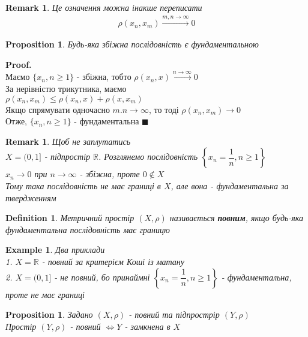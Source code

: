 \documentclass[a4paper, 14pt]{extarticle}
\theoremstyle{theoremdd}
\theoremstyle{theoremdd}
\newtheorem{definition}[theorem]{Definition}
\theoremstyle{theoremdd}
\theoremstyle{theoremdd}
\newtheorem{example}[theorem]{Example}
\theoremstyle{theoremdd}
\newtheorem{proposition}[theorem]{Proposition}
\theoremstyle{theoremdd}
\newtheorem{remark}[theorem]{Remark}
\theoremstyle{theoremdd}
\theoremstyle{theoremdd}
\newenvironment{pf}{\vspace*{-3mm} \textbf{Proof. \\}}{$\blacksquare$}
\begin{document}
\begin{remark}
Це означення можна інакше переписати
\begin{align*}
\rho(x_n,x_m) \overset{m,n \to \infty}{\longrightarrow} 0
\end{align*}
\end{remark}

\begin{proposition}
Будь-яка збіжна послідовність є фундаментальною
\end{proposition}

\begin{pf}
Маємо $\{x_n, n \geq 1\}$ - збіжна, тобто $\rho(x_n,x) \overset{n \to \infty}{\to} 0$\\
За нерівністю трикутника, маємо\\
$\rho(x_n,x_m) \leq \rho(x_n,x) + \rho(x,x_m)$\\
Якщо спрямувати одночасно $m.n \to \infty$, то тоді $\rho(x_n,x_m) \to 0$\\
Отже, $\{x_n, n \geq 1\}$ - фундаментальна
\end{pf}

\begin{remark}
Щоб не заплутатись\\
$X = (0,1]$ - підпростір $\mathbb{R}$. Розглянемо послідовність $\left\{ x_n = \dfrac{1}{n}, n \geq 1 \right\}$\\
$x_n \to 0$ при $n \to \infty$ - збіжна, проте $0 \not\in X$\\
Тому така послідовність не має границі в $X$, але вона - фундаментальна за твердженням
\end{remark}

\begin{definition}
Метричний простір $(X, \rho)$ називається \textbf{повним}, якщо будь-яка фундаментальна послідовність має границю
\end{definition}

\begin{example} Два приклади\\
1. $X = \mathbb{R}$ - повний за критерієм Коші із матану\\
2. $X = (0,1]$ - не повний, бо принаймні $\left\{x_n = \dfrac{1}{n}, n \geq 1 \right\}$ - фундаментальна, проте не має границі
\end{example}

\begin{proposition}
Задано $(X,\rho)$ - повний та підпрострір $(Y,\rho)$\\
Простір $(Y,\rho)$ - повний $\iff Y$ - замкнена в $X$
\end{proposition}
\end{document}
